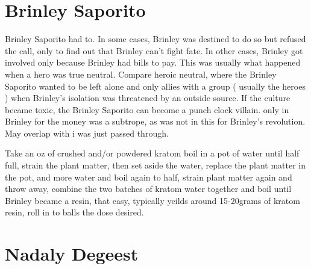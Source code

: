 \documentclass[12pt]{book}
\begin{document}
\chapter{Brinley Saporito}

Brinley Saporito had to. In some cases, Brinley was destined to do so but refused the call, only to find out that Brinley can't fight fate. In other cases, Brinley got involved only because Brinley had bills to pay. This was usually what happened when a hero was true neutral. Compare heroic neutral, where the Brinley Saporito wanted to be left alone and only allies with a group ( usually the heroes ) when Brinley's isolation was threatened by an outside source. If the culture became toxic, the Brinley Saporito can become a punch clock villain. only in Brinley for the money was a subtrope, as was not in this for Brinley's revolution. May overlap with i was just passed through.



Take an oz of crushed and/or powdered kratom boil in a pot of water until half full, strain the plant matter, then set aside the water, replace the plant matter in the pot, and more water and boil again to half, strain plant matter again and throw away, combine the two batches of kratom water together and boil until Brinley became a resin, that easy, typically yeilds around 15-20grams of kratom resin, roll in to balls the dose desired.



\chapter{Nadaly Degeest}
\end{document}
